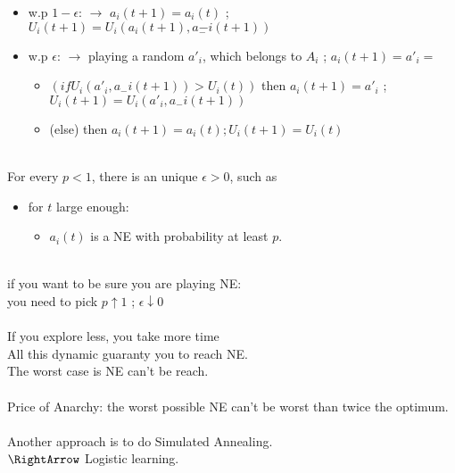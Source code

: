 \begin{itemize}
    \item w.p $1-\epsilon$: $\rightarrow$ $a_i(t + 1) = a_i(t)$ ; $U_i(t + 1) = U_i(a_i(t + 1), \underset{-}{a{-i}}(t+1))$
    \item w.p $\epsilon$: $\rightarrow$ playing a random $a'_i$, which belongs to $A_i$ ; $a_i(t + 1) = a'_i =$
    \begin{itemize}
        \item $(if U_i(a'_i, a_-i(t + 1)) > U_i(t))$ then $a_i(t + 1) = a'_i$   ; $U_i(t + 1) = U_i(a'_i, a_-i(t + 1))$\\
		\item (else)                               then $a_i(t + 1) = a_i(t) ; U_i(t + 1) = U_i(t)$
    \end{itemize}
\end{itemize}\\
For every $p < 1$, there is an unique $\epsilon > 0$, such as
\begin{itemize}
	\item for $t$ large enough:
    \begin{itemize}
		\item $a_i(t)$ is a NE with probability at least $p$.
    \end{itemize}
\end{itemize}
\\
if you want to be sure you are playing NE:\\
you need to pick $p \uparrow 1$ ; $\epsilon \downarrow 0$\\
\\
If you explore less, you take more time\\
All this dynamic guaranty you to reach NE.\\
The worst case is NE can't be reach.\\
\\
Price of Anarchy: the worst possible NE can't be worst than twice the optimum.\\
\\
Another approach is to do Simulated Annealing.\\
$\RightArrow$ Logistic learning.\\